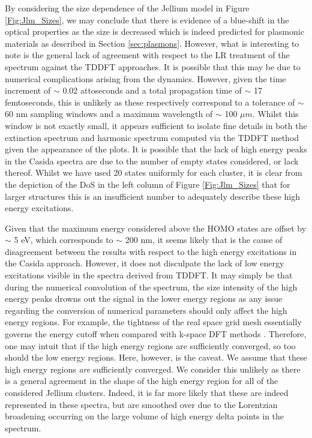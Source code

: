 By considering the size dependence of the Jellium model in Figure \ref{Fig:Jlm_Sizes}, we may conclude that there is evidence of a blue-shift in the optical properties as the size is decreased which is indeed predicted for plasmonic materials as described in Section \ref{sec:plasmons}. However, what is interesting to note is the general lack of agreement with respect to the LR treatment of the spectrum against the TDDFT approaches. It is possible that this may be due to numerical complications arising from the dynamics. However, given the time increment of $\sim$ 0.02 attoseconds and a total propagation time of $\sim$ 17 femtoseconds, this is unlikely as these respectively correspond to a tolerance of $\sim$ 60 nm sampling windows and a maximum wavelength of $\sim$ 100 $\mu m$. Whilst this window is not exactly small, it appears sufficient to isolate fine details in both the extinction spectrum and harmonic spectrum computed via the TDDFT method given the appearance of the plots. It is possible that the lack of high energy peaks in the Casida spectra are due to the number of empty states considered, or lack thereof. Whilst we have used 20 states uniformly for each cluster, it is clear from the depiction of the DoS in the left column of Figure \ref{Fig:Jlm_Sizes} that for larger structures this is an insufficient number to adequately describe these high energy excitations.

Given that the maximum energy considered above the HOMO states are offset by $\sim$ 5 eV, which corresponds to $\sim$ 200 nm, it seems likely that is the cause of disagreement between the results with respect to the high energy excitations in the Casida approach. However, it does not disculpate the lack of low energy excitations visible in the spectra derived from TDDFT. It may simply be that during the numerical convolution of the spectrum, the size intensity of the high energy peaks drowns out the signal in the lower energy regions as any issue regarding the conversion of numerical parameters should only affect the high energy regions. For example, the tightness of the real space grid mesh essentially governs the energy cutoff when compared with k-space DFT methods \cite{cp2k_2020}. Therefore, one may intuit that if the high energy regions are sufficiently converged, so too should the low energy regions. Here, however, is the caveat. We assume that these high energy regions \textit{are} sufficiently converged. We consider this unlikely as there is a general agreement in the shape of the high energy region for all of the considered Jellium clusters. Indeed, it is far more likely that these are indeed represented in these spectra, but are smoothed over due to the Lorentzian broadening occurring on the large volume of high energy delta points in the spectrum. 


